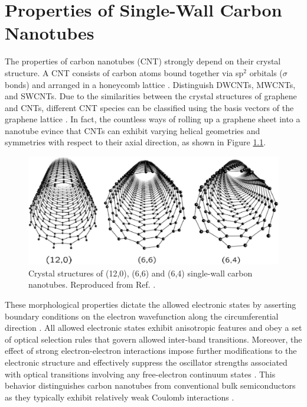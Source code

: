 \chapter{Properties of Single-Wall Carbon Nanotubes}

The properties of carbon nanotubes (CNT) strongly depend on their crystal structure. A CNT consists of carbon atoms bound together via sp$^2$ orbitals ($\sigma$ bonds) and arranged in a honeycomb lattice \cite{soavi2016ultrafast}. {\color{red} Distinguish DWCNTs, MWCNTs, and SWCNTs}. Due to the similarities between the crystal structures of graphene and CNTs, different CNT species can be classified using the basis vectors of the graphene lattice \cite{charlier2007electronic}. In fact, the countless ways of rolling up a graphene sheet into a nanotube evince that CNTs can exhibit varying helical geometries and symmetries with respect to their axial direction, as shown in Figure \ref{fig:symmetries}.

\begin{figure}[h]
	\centering
	\includegraphics[scale=0.4]{images/chapter_optical_props/nanotube_symmetries_charlier}
	\caption{Crystal structures of (12,0), (6,6) and (6,4) single-wall carbon nanotubes. Reproduced from Ref. \cite{charlier2007electronic}.}
	\label{fig:symmetries}
\end{figure}
These morphological properties dictate the allowed electronic states by asserting boundary conditions on the electron wavefunction along the circumferential direction \cite{charlier2007electronic}. All allowed electronic states exhibit anisotropic features and obey a set of optical selection rules that govern allowed inter-band transitions. Moreover, the effect of strong electron-electron interactions impose further modifications to the electronic structure and effectively suppress the oscillator strengths associated with optical transitions involving any free-electron continuum states \cite{ando1997excitons}. This behavior distinguishes carbon nanotubes from conventional bulk semiconductors as they typically exhibit relatively weak Coulomb interactions \cite{ando1997excitons}.


